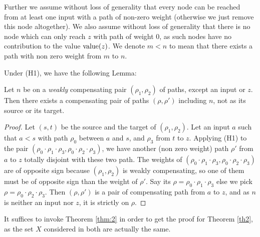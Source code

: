 Further we assume without loss of generality that every node can be reached from at least one input with a path of non-zero weight (otherwise we just remove this node altogether).
We also assume without loss of generality that there is no node which can only reach $z$ with path of weight $0$, as such nodes have no contribution to the value ${\textrm{value}}(z)$. We denote $m<n$ to mean that there exists a path with non zero weight from $m$ to $n$.

Under (H1), we have the following Lemma:

\begin{lemma}
  Let $n$ be on a {\em weakly} compensating pair $(\rho_1,\rho_2)$ of paths, 
  except an input or $z$. Then there exists a compensating pair of paths 
 $(\rho,\rho')$ including $n$, not as its source or its target.
\end{lemma}

\begin{proof}
Let $(s,t)$ be the source and the target of $(\rho_1,\rho_2)$.
Let an input $a$ such that $a<s$ with path $\rho_0$ between $a$ and $s$,
and $\rho_3$  from $t$ to $z$.
Applying (H1) to the pair 
$(\rho_0 \cdot \rho_1 \cdot \rho_3, \rho_0\cdot \rho_2 \cdot \rho_3)$, 
we have another (non zero weight) path $\rho'$ from $a$ to $z$ totally disjoint with these two path.
The weights of $(\rho_0 \cdot \rho_1 \cdot \rho_3, \rho_0\cdot \rho_2 \cdot \rho_3)$
are of opposite sign because $(\rho_1,\rho_2)$ is weakly compensating, so one of them must be of opposite sign than the weight of $\rho'$. Say its $\rho = \rho_0 \cdot \rho_1 \cdot \rho_3$
else we pick $\rho=\rho_0\cdot \rho_2 \cdot \rho_3$.
Then $(\rho,\rho')$ is a pair of compensating path from $a$ to $z$, and as $n$ is neither an input nor $z$, it is strictly on $\rho$.
\end{proof}

It suffices to invoke Theorem \ref{thm:2} in order to get the proof for Theorem \ref{th2},
as the set $X$ considered in both are actually the same.

















































